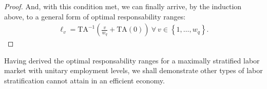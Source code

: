 \documentclass[hidelinks, nonatbib]{elsarticle}
\begin{document}
\begin{lemma}
\begin{proof}
        And, with this condition met, we can finally arrive, by the induction above, to a general form of optimal responsability ranges:
        \begin{gather}
        \ell_v
        =
        \text{TA}^{-1}\left(
            \frac{v}{w_q}
            +
            \text{TA}(0)
        \right)
        \
        \forall
        \
        v \in 
        \left\{
            1, \dots, w_q
        \right\}
        .
        \end{gather}    
    \end{proof}
\end{lemma}

Having derived the optimal responsability ranges for a maximally stratified labor market with unitary employment levels, we shall demonstrate other types of labor stratification cannot attain in an efficient economy.
\end{document}

